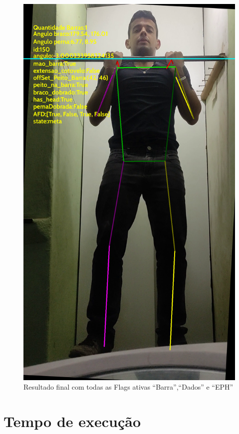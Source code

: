 \begin{figure}[!htb]
	\centering
	\includegraphics[scale=0.33]{figuras/flags.png}
	\caption{Resultado final com todas as Flags ativas ``Barra'',``Dados'' e ``EPH''}
\end{figure}
\newpage



\section[Tempo de execução]{Tempo de execução}

